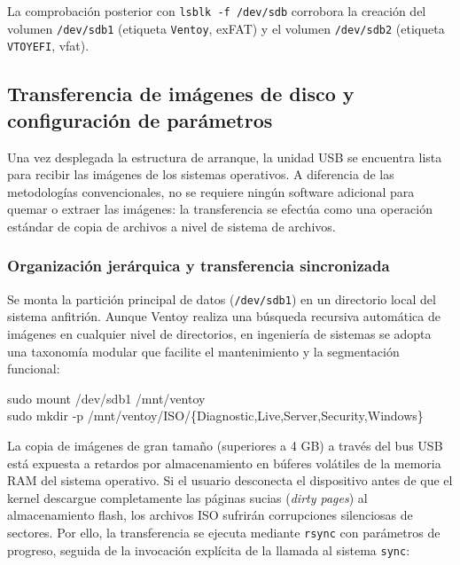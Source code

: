 \documentclass[12pt]{article}
\begin{document}
La comprobación posterior con \texttt{lsblk -f /dev/sdb} corrobora la creación del volumen \texttt{/dev/sdb1} (etiqueta \texttt{Ventoy}, exFAT) y el volumen \texttt{/dev/sdb2} (etiqueta \texttt{VTOYEFI}, vfat).

\subsection{Transferencia de imágenes de disco y configuración de parámetros}
\label{sec:transferenciaParametros}

Una vez desplegada la estructura de arranque, la unidad USB se encuentra lista para recibir las imágenes de los sistemas operativos. A diferencia de las metodologías convencionales, no se requiere ningún software adicional para quemar o extraer las imágenes: la transferencia se efectúa como una operación estándar de copia de archivos a nivel de sistema de archivos.

\subsubsection{Organización jerárquica y transferencia sincronizada}

Se monta la partición principal de datos (\texttt{/dev/sdb1}) en un directorio local del sistema anfitrión. Aunque Ventoy realiza una búsqueda recursiva automática de imágenes en cualquier nivel de directorios, en ingeniería de sistemas se adopta una taxonomía modular que facilite el mantenimiento y la segmentación funcional:

\begin{mdframed}[style=terminal]
\ttfamily\upshape\color{bashLetterColor}\footnotesize
sudo mount /dev/sdb1 /mnt/ventoy \\
sudo mkdir -p /mnt/ventoy/ISO/\{Diagnostic,Live,Server,Security,Windows\}
\end{mdframed}

La copia de imágenes de gran tamaño (superiores a 4 GB) a través del bus USB está expuesta a retardos por almacenamiento en búferes volátiles de la memoria RAM del sistema operativo. Si el usuario desconecta el dispositivo antes de que el kernel descargue completamente las páginas sucias (\textit{dirty pages}) al almacenamiento flash, los archivos ISO sufrirán corrupciones silenciosas de sectores. Por ello, la transferencia se ejecuta mediante \texttt{rsync} con parámetros de progreso, seguida de la invocación explícita de la llamada al sistema \texttt{sync}:
\end{document}
